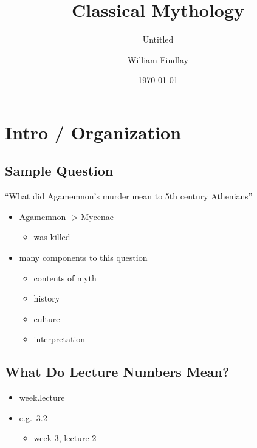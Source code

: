 \documentclass[
  12pt]{findlay}
\title{Classical Mythology}
\subtitle{Untitled}
\author{William Findlay}
\date{\today}
\providecommand{\tightlist}{%
  \setlength{\itemsep}{0pt}\setlength{\parskip}{0pt}}
\begin{document}
\maketitle

\hypertarget{intro-organization}{%
\section{Intro / Organization}\label{intro-organization}}

\hypertarget{sample-question}{%
\subsection{Sample Question}\label{sample-question}}

``What did Agamemnon's murder mean to 5th century Athenians''

\begin{itemize}
\tightlist
\item
  Agamemnon -\textgreater{} Mycenae

  \begin{itemize}
  \tightlist
  \item
    was killed
  \end{itemize}
\item
  many components to this question

  \begin{itemize}
  \tightlist
  \item
    contents of myth
  \item
    history
  \item
    culture
  \item
    interpretation
  \end{itemize}
\end{itemize}

\hypertarget{what-do-lecture-numbers-mean}{%
\subsection{What Do Lecture Numbers
Mean?}\label{what-do-lecture-numbers-mean}}

\begin{itemize}
\tightlist
\item
  week.lecture
\item
  e.g.~3.2

  \begin{itemize}
  \tightlist
  \item
    week 3, lecture 2
  \end{itemize}
\end{itemize}
\end{document}
